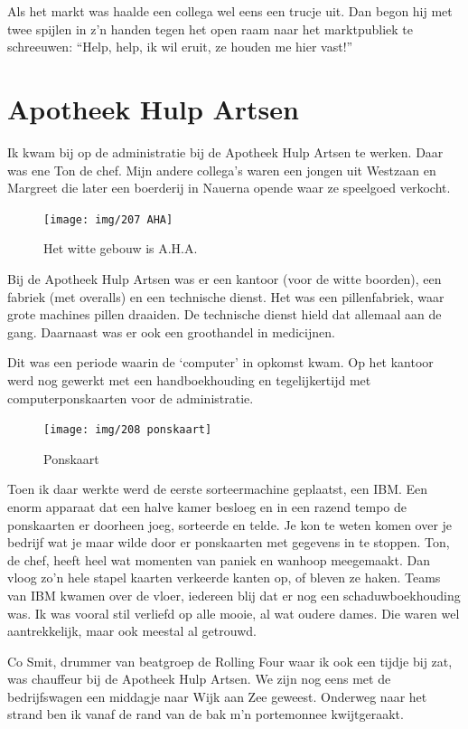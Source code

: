 \documentclass[10pt,twoside, openright]{memoir}
\begin{document}
Als het markt was haalde een collega wel eens een trucje uit.  Dan begon hij met twee spijlen in z'n handen tegen het open raam naar het marktpubliek te schreeuwen: ``Help, help, ik wil eruit, ze houden me hier vast!''

\section{Apotheek Hulp Artsen} %
\label{cha:apotheek}

Ik kwam bij op de administratie bij de Apotheek Hulp Artsen te werken. Daar was ene Ton de chef. Mijn andere collega's waren een jongen uit Westzaan en Margreet die later een boerderij in Nauerna opende waar ze speelgoed verkocht. 

\begin{figure}
\texttt{[image: img/207 AHA]}
\caption*{\footnotesize Het witte gebouw is A.H.A.}
\end{figure}

Bij de Apotheek Hulp Artsen was er een kantoor (voor de witte boorden), een fabriek (met overalls) en een technische dienst. Het was een pillenfabriek, waar grote machines pillen draaiden. De technische dienst hield dat allemaal aan de gang. Daarnaast was er ook een groothandel in medicijnen. 

Dit was een periode waarin de `computer' in opkomst kwam. Op het kantoor werd nog gewerkt met een handboekhouding en tegelijkertijd met computerponskaarten voor de administratie. 

\begin{figure}
\texttt{[image: img/208 ponskaart]}
\caption*{\footnotesize Ponskaart}
\end{figure}

Toen ik daar werkte werd de eerste sorteermachine geplaatst, een IBM. Een enorm apparaat dat een halve kamer besloeg en in een razend tempo de ponskaarten er doorheen joeg, sorteerde en telde. Je kon te weten komen over je bedrijf wat je maar wilde  door er ponskaarten met gegevens in te stoppen. Ton, de chef, heeft heel wat momenten van paniek en wanhoop meegemaakt. Dan vloog zo’n hele stapel kaarten verkeerde kanten op, of bleven ze haken. Teams van IBM kwamen over de vloer, iedereen blij dat er nog een schaduwboekhouding was. Ik was vooral stil verliefd op alle mooie, al wat oudere dames. Die waren wel aantrekkelijk, maar ook meestal al getrouwd. 

Co Smit, drummer van beatgroep de Rolling Four waar ik ook een tijdje bij zat, was chauffeur bij de Apotheek Hulp Artsen. We zijn nog eens met de bedrijfswagen een middagje naar Wijk aan Zee geweest. Onderweg naar het strand ben ik vanaf de rand van de bak m’n portemonnee kwijtgeraakt.
\end{document}

